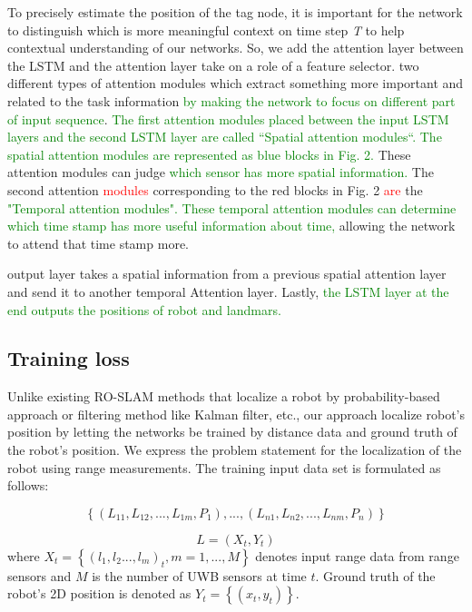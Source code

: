 \documentclass{ieeeaccess}
\begin{document}
To precisely estimate the position of the tag node, it is important for the network to distinguish which is more meaningful context on time step \textit{T} to help contextual understanding of our  networks. So, we add the attention layer between the LSTM and the attention layer take on a role of a feature selector\cite{wang2017residual}.  two different types of attention modules \cite{luong2015effective} which extract something more important and related to the task information \textcolor{green}{by making the network to focus on different part of input sequence}. \textcolor{green}{The first attention modules placed between the input LSTM layers and the second LSTM layer are called “Spatial attention modules“. The spatial attention modules are represented as blue blocks in Fig. 2.} These attention modules can judge \textcolor{green}{which sensor has more spatial information.} The second attention \textcolor{red}{modules} corresponding to the red blocks in Fig. 2 \textcolor{red}{are} the \textcolor{green}{"Temporal attention modules". These temporal attention modules can determine which time stamp has more useful information about time,} allowing the network to attend that time stamp more.  


output layer takes a spatial information from a previous spatial attention layer and send it to another temporal Attention layer. Lastly, \textcolor{green}{the LSTM layer at the end outputs the positions of robot and landmars.}

\subsection{Training loss}

 Unlike existing RO-SLAM methods that localize a robot by probability-based approach or filtering method like Kalman filter, etc., our approach localize  robot's position by letting the networks be trained by distance data and ground truth of the robot's position. We express the problem statement for the localization of the robot using range measurements. The training input data set is formulated as follows: 
 
 
\begin{equation}
\left\{(L_{11}, L_{12}, ..., L_{1m}, P_1),...,(L_{n1}, L_{n2}, ..., L_{nm}, P_n)\right\}
\end{equation} 

\begin{equation}
L = {(X_t, Y_t)} 
\end{equation}
where $X_t = \left\{(l_1, l_2... , l_m)_t, m = 1,...,M \right \}$ denotes input range data from range sensors and $M$ is the number of UWB sensors at time $t$. Ground truth of the robot's 2D position is denoted as $Y_t = \left\{(x_t, y_t)\right \}$.
\end{document}
